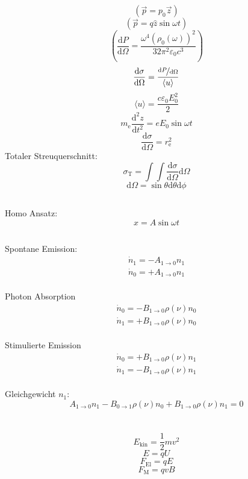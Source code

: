 \documentclass[12pt]{report}
\newcommand{\vepsilon}{\varepsilon}
\newcommand{\dd}{\mathrm{d}}
\begin{document}
\subsection{}

\[(\vec{p}=p_0\vec{z})\]
\[(\vec{p}=q\hat{z}\sin\omega t)\]
\[\left(\frac{\dd P}{\dd\Omega}=\frac{\omega^4(\rho_0(\omega))^2}{32\pi^2\vepsilon_0c^3}\right)\]
\[\frac{\dd\sigma}{\dd\Omega}=\frac{\nicefrac{\dd P}{\dd\Omega}}{\langle u\rangle}\]
\[\langle u\rangle=\frac{c\vepsilon_0E_0^2}{2}\]
\[m_\mathrm{e}\frac{\dd^2z}{\dd t^2}=eE_0\sin\omega t\]
\[\frac{\dd\sigma}{\dd\Omega}=r_\mathrm{e}^2\]
Totaler Streuquerschnitt:
\[\sigma_\mathrm{T}=\int\int\frac{\dd\sigma}{\dd\Omega}\dd\Omega\]
\[\dd\Omega=\sin\theta\dd\theta\dd\phi\]

\subsection{}
Homo Ansatz: \[x=A\sin\omega t\]

\subsection{}
Spontane Emission: \begin{align*}\dot{n}_1=-A_{1\to0}n_1\\\dot{n}_0=+A_{1\to0}n_1\end{align*}\\
Photon Absorption\begin{align*}\dot{n}_0=-B_{1\to0}\rho(\nu)n_0\\\dot{n}_1=+B_{1\to0}\rho(\nu)n_0\end{align*}\\
Stimulierte Emission\begin{align*}\dot{n}_0=+B_{1\to0}\rho(\nu)n_1\\\dot{n}_1=-B_{1\to0}\rho(\nu)n_1\end{align*}\\
Gleichgewicht $n_1$:
\[A_{1\to0}n_1-B_{0\to1}\rho(\nu)n_0+B_{1\to0}\rho(\nu)n_1=0\]

\section{}

\subsection{}
\[E_\mathrm{kin}=\frac{1}{2}mv^2\]
\[E=qU\]
\[F_\mathrm{El}=qE\]
\[F_\mathrm{M}=qvB\]
\end{document}
